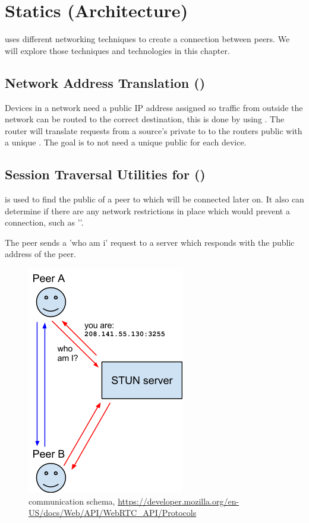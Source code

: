 \section{Statics (Architecture)}
 uses different networking techniques to create a connection between peers. We will explore those techniques and technologies in this chapter.

\subsection{Network Address Translation ()}
Devices in a network need a public IP address assigned so traffic from outside the network can be routed to the correct destination, this is done by using . The router will translate requests from a source's private  to to the routers public  with a unique . The goal is to not need a unique public  for each device.

\clearpage
\subsection{Session Traversal Utilities for  ()}
 is used to find the public  of a peer to which will be connected later on. It also can determine if there are any network restrictions in place which would prevent a connection, such as ''.

The peer sends a 'who am i' request to a  server which responds with the public address of the peer.

\begin{figure}[H]
	\includegraphics[scale=0.5]{images/webrtc-stun.png}
	\centering
	\caption{ communication schema, \url{https://developer.mozilla.org/en-US/docs/Web/API/WebRTC_API/Protocols}}
	\label{fig:STUN}
\end{figure}

